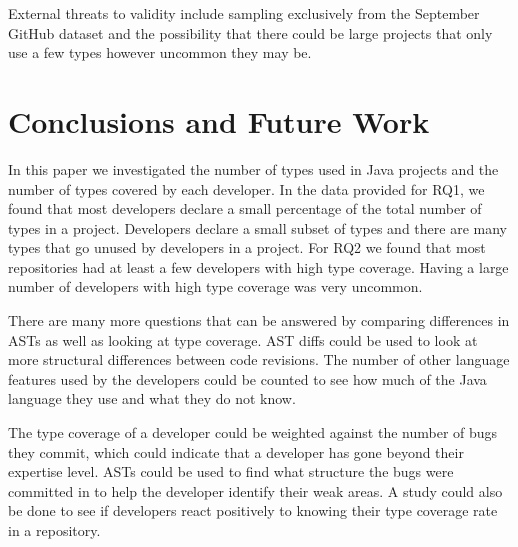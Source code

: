 \documentclass{sig-alternate-05-2015}
\begin{document}
External threats to validity include sampling exclusively from the September GitHub dataset and the possibility that there could be large projects that only use a few types however uncommon they may be.

\section{Conclusions and Future Work}
In this paper we investigated the number of types used in Java projects and the number of types covered by each developer. In the data provided for RQ1, we found that most developers declare a small percentage of the total number of types in a project. Developers declare a small subset of types and there are many types that go unused by developers in a project. For RQ2 we found that most repositories had at least a few developers with high type coverage. Having a large number of developers with high type coverage was very uncommon.

There are many more questions that can be answered by comparing differences in ASTs as well as looking at type coverage. AST diffs could be used to look at more structural differences between code revisions. The number of other language features used by the developers could be counted to see how much of the Java language they use and what they do not know.

The type coverage of a developer could be weighted against the number of bugs they commit, which could indicate that a developer has gone beyond their expertise level. ASTs could be used to find what structure the bugs were committed in to help the developer identify their weak areas. A study could also be done to see if developers react positively to knowing their type coverage rate in a repository.



%

%
%

\end{document}
